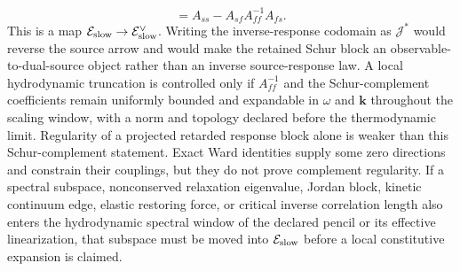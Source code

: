 \begin{controlledapproximation}
\begin{equation}
  =
  A_{ss}-A_{sf}A_{ff}^{-1}A_{fs}.
  \label{eq:hydro-slow-sector-schur-complement}
\end{equation}
This is a map
\(\mathcal E_{\rm slow}\to\mathcal E_{\rm slow}^\vee\).  Writing the
inverse-response codomain as \(\mathcal J^*\) would reverse the source arrow
and would make the retained Schur block an observable-to-dual-source object
rather than an inverse source-response law.
A local hydrodynamic truncation is controlled only if \(A_{ff}^{-1}\) and
the Schur-complement coefficients remain uniformly bounded and expandable in
\(\omega\) and \(\mathbf k\) throughout the scaling window, with a norm and
topology declared before the thermodynamic limit.  Regularity of a projected
retarded response block alone is weaker than this Schur-complement statement.
Exact Ward identities supply some zero directions and constrain their
couplings, but they do not prove complement regularity.  If a spectral subspace,
nonconserved relaxation eigenvalue, Jordan block, kinetic continuum edge,
elastic restoring force, or critical inverse correlation length also enters
the hydrodynamic spectral window of the declared pencil or its effective
linearization, that subspace must be moved into \(\mathcal E_{\rm slow}\)
before a local constitutive expansion is claimed.
\end{controlledapproximation}

